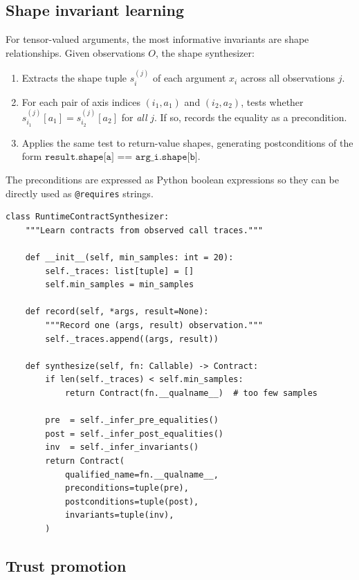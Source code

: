 \documentclass[11pt]{article}
\begin{document}
\subsection{Shape invariant learning}

For tensor-valued arguments, the most informative invariants are shape
relationships.  Given observations $O$, the shape synthesizer:

\begin{enumerate}[label=(\arabic*)]
  \item Extracts the shape tuple $s_i^{(j)}$ of each argument $x_i$
    across all observations $j$.
  \item For each pair of axis indices $(i_1, a_1)$ and $(i_2, a_2)$,
    tests whether $s_{i_1}^{(j)}[a_1] = s_{i_2}^{(j)}[a_2]$ for
    \emph{all} $j$.  If so, records the equality as a precondition.
  \item Applies the same test to return-value shapes, generating
    postconditions of the form
    $\texttt{result.shape[a] == arg\_i.shape[b]}$.
\end{enumerate}

The preconditions are expressed as Python boolean expressions so they
can be directly used as \texttt{@requires} strings.

\begin{lstlisting}[style=jugeo-python,
  caption={Runtime synthesis: shape-equality precondition discovery.}]
class RuntimeContractSynthesizer:
    """Learn contracts from observed call traces."""

    def __init__(self, min_samples: int = 20):
        self._traces: list[tuple] = []
        self.min_samples = min_samples

    def record(self, *args, result=None):
        """Record one (args, result) observation."""
        self._traces.append((args, result))

    def synthesize(self, fn: Callable) -> Contract:
        if len(self._traces) < self.min_samples:
            return Contract(fn.__qualname__)  # too few samples

        pre  = self._infer_pre_equalities()
        post = self._infer_post_equalities()
        inv  = self._infer_invariants()
        return Contract(
            qualified_name=fn.__qualname__,
            preconditions=tuple(pre),
            postconditions=tuple(post),
            invariants=tuple(inv),
        )
\end{lstlisting}

\subsection{Trust promotion}
\end{document}
